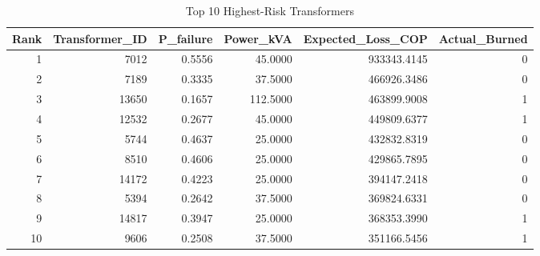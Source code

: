 \begin{table}
\caption{Top 10 Highest-Risk Transformers}
\label{tab:risk}
\begin{tabular}{rrrrrr}
\toprule
Rank & Transformer_ID & P_failure & Power_kVA & Expected_Loss_COP & Actual_Burned \\
\midrule
1 & 7012 & 0.5556 & 45.0000 & 933343.4145 & 0 \\
2 & 7189 & 0.3335 & 37.5000 & 466926.3486 & 0 \\
3 & 13650 & 0.1657 & 112.5000 & 463899.9008 & 1 \\
4 & 12532 & 0.2677 & 45.0000 & 449809.6377 & 1 \\
5 & 5744 & 0.4637 & 25.0000 & 432832.8319 & 0 \\
6 & 8510 & 0.4606 & 25.0000 & 429865.7895 & 0 \\
7 & 14172 & 0.4223 & 25.0000 & 394147.2418 & 0 \\
8 & 5394 & 0.2642 & 37.5000 & 369824.6331 & 0 \\
9 & 14817 & 0.3947 & 25.0000 & 368353.3990 & 1 \\
10 & 9606 & 0.2508 & 37.5000 & 351166.5456 & 1 \\
\bottomrule
\end{tabular}
\end{table}
